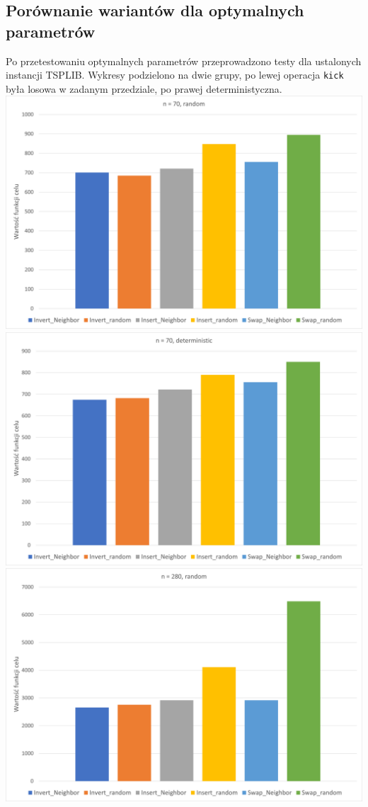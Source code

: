\documentclass{article}
\begin{document}
\newpage
\subsection{Porównanie wariantów dla optymalnych parametrów}

Po przetestowaniu optymalnych parametrów przeprowadzono testy dla ustalonych instancji TSPLIB. Wykresy podzielono na dwie grupy, po lewej operacja \texttt{kick} była losowa w zadanym przedziale, po prawej deterministyczna.
\\

\includegraphics[scale=0.36]{70_rand}
\includegraphics[scale=0.36]{70_deter}
\includegraphics[scale=0.36]{280_rand}
\end{document}
